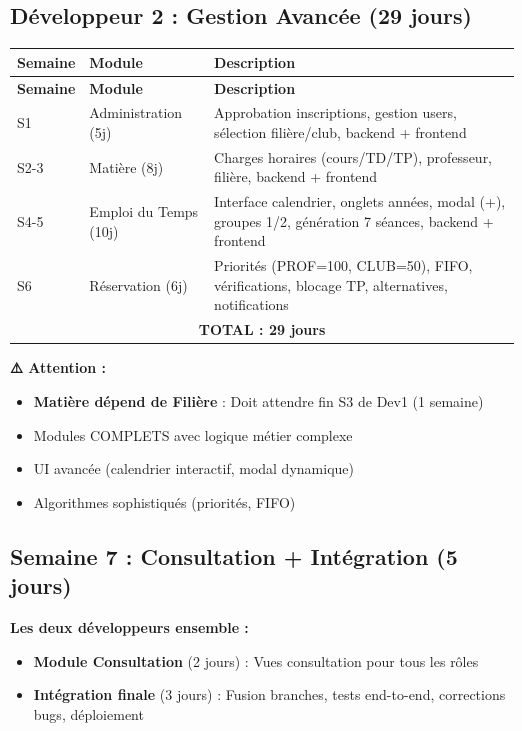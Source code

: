 \documentclass[12pt,a4paper]{article}
\begin{document}
\subsection{Développeur 2 : Gestion Avancée (29 jours)}

\begin{longtable}{|l|l|p{7cm}|}
\hline
\textbf{Semaine} & \textbf{Module} & \textbf{Description} \\
\hline
\endfirsthead
\hline
\textbf{Semaine} & \textbf{Module} & \textbf{Description} \\
\hline
\endhead
S1 & Administration (5j) & Approbation inscriptions, gestion users, sélection filière/club, backend + frontend \\
\hline
S2-3 & Matière (8j) & Charges horaires (cours/TD/TP), professeur, filière, backend + frontend \\
\hline
S4-5 & Emploi du Temps (10j) & Interface calendrier, onglets années, modal (+), groupes 1/2, génération 7 séances, backend + frontend \\
\hline
S6 & Réservation (6j) & Priorités (PROF=100, CLUB=50), FIFO, vérifications, blocage TP, alternatives, notifications \\
\hline
\multicolumn{3}{|c|}{\textbf{TOTAL : 29 jours}} \\
\hline
\end{longtable}

\textbf{⚠️ Attention :}
\begin{itemize}
    \item \textbf{Matière dépend de Filière} : Doit attendre fin S3 de Dev1 (1 semaine)
    \item Modules COMPLETS avec logique métier complexe
    \item UI avancée (calendrier interactif, modal dynamique)
    \item Algorithmes sophistiqués (priorités, FIFO)
\end{itemize}

\subsection{Semaine 7 : Consultation + Intégration (5 jours)}

\textbf{Les deux développeurs ensemble :}

\begin{itemize}
    \item \textbf{Module Consultation} (2 jours) : Vues consultation pour tous les rôles
    \item \textbf{Intégration finale} (3 jours) : Fusion branches, tests end-to-end, corrections bugs, déploiement
\end{itemize}
\end{document}
